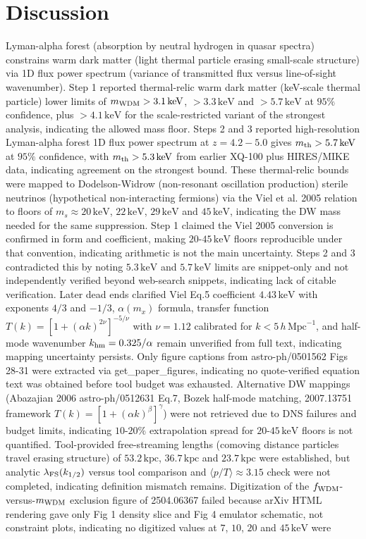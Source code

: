 \documentclass[11pt,a4paper]{article}
\begin{document}
\section{Discussion}
Lyman-alpha forest (absorption by neutral hydrogen in quasar spectra) constrains warm dark matter (light thermal particle erasing small-scale structure) via 1D flux power spectrum (variance of transmitted flux versus line-of-sight wavenumber). Step 1 reported thermal-relic warm dark matter (keV-scale thermal particle) lower limits of $m_{\rm WDM} > 3.1\,\mathrm{keV}$, $>3.3\,\mathrm{keV}$ and $>5.7\,\mathrm{keV}$ at $95\%$ confidence, plus $>4.1\,\mathrm{keV}$ for the scale-restricted variant of the strongest analysis, indicating the allowed mass floor. Steps 2 and 3 reported high-resolution Lyman-alpha forest 1D flux power spectrum at $z = 4.2-5.0$ gives $m_{\rm th} > 5.7\,\mathrm{keV}$ at $95\%$ confidence, with $m_{\rm th} > 5.3\,\mathrm{keV}$ from earlier XQ-100 plus HIRES/MIKE data, indicating agreement on the strongest bound. These thermal-relic bounds were mapped to Dodelson-Widrow (non-resonant oscillation production) sterile neutrinos (hypothetical non-interacting fermions) via the Viel et al. 2005 relation to floors of $m_s \approx 20\,\mathrm{keV}$, $22\,\mathrm{keV}$, $29\,\mathrm{keV}$ and $45\,\mathrm{keV}$, indicating the DW mass needed for the same suppression. Step 1 claimed the Viel 2005 conversion is confirmed in form and coefficient, making $20$-$45\,\mathrm{keV}$ floors reproducible under that convention, indicating arithmetic is not the main uncertainty. Steps 2 and 3 contradicted this by noting $5.3\,\mathrm{keV}$ and $5.7\,\mathrm{keV}$ limits are snippet-only and not independently verified beyond web-search snippets, indicating lack of citable verification. Later dead ends clarified Viel Eq.5 coefficient $4.43\,\mathrm{keV}$ with exponents $4/3$ and $-1/3$, $\alpha(m_x)$ formula, transfer function $T(k)=[1+(\alpha k)^{2\nu}]^{-5/\nu}$ with $\nu=1.12$ calibrated for $k < 5\,h\,\mathrm{Mpc}^{-1}$, and half-mode wavenumber $k_{\rm hm}=0.325/\alpha$ remain unverified from full text, indicating mapping uncertainty persists. Only figure captions from astro-ph/0501562 Figs 28-31 were extracted via get\_paper\_figures, indicating no quote-verified equation text was obtained before tool budget was exhausted. Alternative DW mappings (Abazajian 2006 astro-ph/0512631 Eq.7, Bozek half-mode matching, 2007.13751 framework $T(k)=[1+(\alpha k)^{\beta}]^{\gamma}$) were not retrieved due to DNS failures and budget limits, indicating $10$-$20\%$ extrapolation spread for $20$-$45\,\mathrm{keV}$ floors is not quantified. Tool-provided free-streaming lengths (comoving distance particles travel erasing structure) of $53.2\,\mathrm{kpc}$, $36.7\,\mathrm{kpc}$ and $23.7\,\mathrm{kpc}$ were established, but analytic $\lambda_{\rm FS}(k_{1/2})$ versus tool comparison and $\langle p/T \rangle \approx 3.15$ check were not completed, indicating definition mismatch remains. Digitization of the $f_{\rm WDM}$-versus-$m_{\rm WDM}$ exclusion figure of 2504.06367 failed because arXiv HTML rendering gave only Fig 1 density slice and Fig 4 emulator schematic, not constraint plots, indicating no digitized values at $7$, $10$, $20$ and $45\,\mathrm{keV}$ were 
\end{document}
